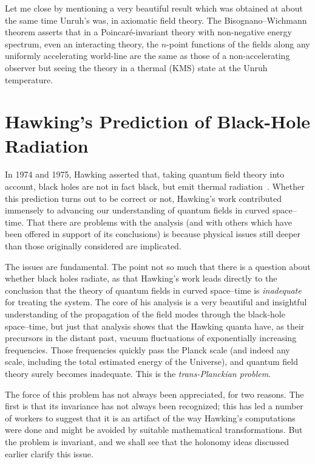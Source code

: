 \documentclass[
%
draft    %
,numberedheadings 
,bibliocites
  ]
  {aipproc}
\begin{document}
Let me close by mentioning a very beautiful result which was obtained at about the same time Unruh's was, in axiomatic field theory.  The Bisognano--Wichmann theorem \citep{Bisognano:1976za} asserts that in a Poincar\'e-invariant theory with non-negative energy spectrum, even an interacting theory, the $n$-point functions of the fields along any uniformly accelerating world-line are the same as those of a non-accelerating observer but seeing the theory in a thermal (KMS) state at the Unruh temperature.




\section{Hawking's Prediction of Black-Hole Radiation}

In 1974 and 1975, Hawking asserted that, taking quantum field theory into account, black holes are not in fact black, but emit thermal radiation~\citep{Hawking:1974rv,Hawking:1974sw}.  Whether this prediction turns out to be correct or not, Hawking's work contributed immensely to advancing our understanding of quantum fields in curved space--time.  
That there are problems with the analysis (and with others which have been offered in support of its conclusions) is because
physical issues still deeper than those originally considered are implicated.

The issues are fundamental.  The point not so much that there is a question about whether black holes radiate, as that Hawking's work leads directly to the conclusion that the theory of quantum fields in curved space--time is {\em inadequate} for treating the system. 
The core of his analysis is a very beautiful and insightful 
understanding of the propagation of the field modes through the black-hole space--time,
but just that analysis shows 
that the Hawking quanta have, as their precursors in the distant past, vacuum fluctuations of exponentially increasing frequencies.  Those frequencies quickly pass the Planck scale (and indeed any scale, including the total estimated energy of the Universe), and quantum field theory surely becomes inadequate.  This is the {\em trans-Planckian problem}.

The force of this problem has not always been appreciated, for two reasons.  The first is that its invariance has not always been recognized; this has led a number of workers to suggest that it is an artifact of the way Hawking's computations were done and might be avoided by suitable mathematical transformations.
But the problem is invariant, and 
we shall see that the holonomy ideas discussed earlier clarify this issue.  
\end{document}
